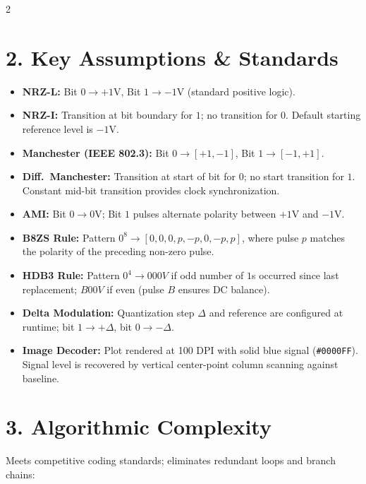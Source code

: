 \documentclass[8.5pt,a4paper]{article}
\begin{document}
\begin{multicols}{2}
\section{2. Key Assumptions \& Standards}
\begin{itemize}
    \item \textbf{NRZ-L:} Bit $0 \to +1\text{V}$, Bit $1 \to -1\text{V}$ (standard positive logic).
    \item \textbf{NRZ-I:} Transition at bit boundary for $1$; no transition for $0$. Default starting reference level is $-1\text{V}$.
    \item \textbf{Manchester (IEEE 802.3):} Bit $0 \to [+1, -1]$, Bit $1 \to [-1, +1]$.
    \item \textbf{Diff.\ Manchester:} Transition at start of bit for $0$; no start transition for $1$. Constant mid-bit transition provides clock synchronization.
    \item \textbf{AMI:} Bit $0 \to 0\text{V}$; Bit $1$ pulses alternate polarity between $+1\text{V}$ and $-1\text{V}$.
    \item \textbf{B8ZS Rule:} Pattern $0^8 \to [0, 0, 0, p, -p, 0, -p, p]$, where pulse $p$ matches the polarity of the preceding non-zero pulse.
    \item \textbf{HDB3 Rule:} Pattern $0^4 \to 000V$ if odd number of $1$s occurred since last replacement; $B00V$ if even (pulse $B$ ensures DC balance).
    \item \textbf{Delta Modulation:} Quantization step $\Delta$ and reference are configured at runtime; bit $1 \to +\Delta$, bit $0 \to -\Delta$.
    \item \textbf{Image Decoder:} Plot rendered at 100 DPI with solid blue signal (\texttt{\#0000FF}). Signal level is recovered by vertical center-point column scanning against baseline.
\end{itemize}

\vfill\null
\columnbreak

\section{3. Algorithmic Complexity}
Meets competitive coding standards; eliminates redundant loops and branch chains:
\vspace{1.5pt}


\end{multicols}
\end{document}
